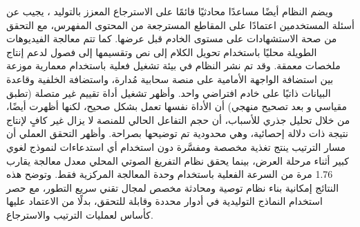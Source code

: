 \begin{Arabic}
ويضم النظام أيضًا مساعدًا محادثيًا قائمًا على الاسترجاع المعزز بالتوليد ، يجيب عن أسئلة المستخدمين اعتمادًا على المقاطع المسترجعة من المحتوى المفهرس، مع التحقق من صحة الاستشهادات على مستوى الخادم قبل عرضها. كما تتم معالجة الفيديوهات الطويلة محليًا باستخدام تحويل الكلام إلى نص وتقسيمها إلى فصول لدعم إنتاج ملخصات معمقة. وقد تم نشر النظام في بيئة تشغيل فعلية باستخدام معمارية موزعة بين استضافة الواجهة الأمامية على منصة سحابية مُدارة، واستضافة الخلفية وقاعدة البيانات ذاتيًا على خادم افتراضي واحد. وأظهر تشغيل أداة تقييم غير متصلة (تطبق مقياسي  و بعد تصحيح منهجي) أن الأداة نفسها تعمل بشكل صحيح، لكنها أظهرت أيضًا، من خلال تحليل جذري للأسباب، أن حجم التفاعل الحالي للمنصة لا يزال غير كافٍ لإنتاج نتيجة ذات دلالة إحصائية، وهي محدودية تم توضيحها بصراحة. وأظهر التحقق العملي أن مسار الترتيب ينتج تغذية مخصصة ومفسَّرة دون استخدام أي استدعاءات لنموذج لغوي كبير أثناء مرحلة العرض، بينما يحقق نظام التفريغ الصوتي المحلي معدل معالجة يقارب 1.76 مرة من السرعة الفعلية باستخدام وحدة المعالجة المركزية فقط. وتوضح هذه النتائج إمكانية بناء نظام توصية ومحادثة مخصص لمجال تقني سريع التطور، مع حصر استخدام النماذج التوليدية في أدوار محددة وقابلة للتحقق، بدلًا من الاعتماد عليها كأساس لعمليات الترتيب والاسترجاع.

\end{Arabic}
